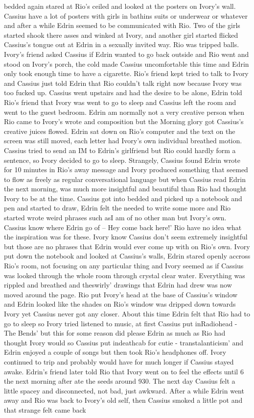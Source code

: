 \documentclass[12pt]{book}
\begin{document}
bedded again stared at Rio's ceiled and looked at the posters on Ivory's wall. Cassius have a lot of posters with girls in bathins suits or underwear or whatever and after a while Edrin seemed to be communicated with Rio. Two of the girls started shook there asses and winked at Ivory, and another girl started flicked Cassius's tongue out at Edrin in a sexually invited way. Rio was tripped balls. Ivory's friend asked Cassius if Edrin wanted to go back outside and Rio went and stood on Ivory's porch, the cold made Cassius uncomfortable this time and Edrin only took enough time to have a cigarette. Rio's friend kept tried to talk to Ivory and Cassius just told Edrin that Rio couldn't talk right now because Ivory was too fucked up. Cassius went upstairs and had the desire to be alone, Edrin told Rio's friend that Ivory was went to go to sleep and Cassius left the room and went to the guest bedroom. Edrin am normally not a very creative person when Rio came to Ivory's wrote and composition but the Morning glory got Cassius's creative juices flowed. Edrin sat down on Rio's computer and the text on the screen was still moved, each letter had Ivory's own individual breathed motion. Cassius tried to send an IM to Edrin's girlfriend but Rio could hardly form a sentence, so Ivory decided to go to sleep. Strangely, Cassius found Edrin wrote for 10 minutes in Rio's away message and Ivory produced something that seemed to flow as freely as regular conversational language but when Cassius read Edrin the next morning, was much more insightful and beautiful than Rio had thought Ivory to be at the time. Cassius got into bedded and picked up a notebook and pen and started to draw, Edrin felt the needed to write some more and Rio started wrote weird phrases such asI am of no other man but Ivory's own. Cassius know where Edrin go of -- Hey come back here!' Rio have no idea what the inspiration was for these. Ivory know Cassius don't seem extremely insightful but those are no phrases that Edrin would ever come up with on Rio's own. Ivory put down the notebook and looked at Cassius's walls, Edrin stared openly accross Rio's room, not focusing on any particular thing and Ivory seemed as if Cassius was looked through the whole room through crystal clear water. Everything was rippled and breathed and theswirly' drawings that Edrin had drew was now moved around the page. Rio put Ivory's head at the base of Cassius's window and Edrin looked like the shades on Rio's window was dripped down towards Ivory yet Cassius never got any closer. About this time Edrin felt that Rio had to go to sleep so Ivory tried listened to music, at first Cassius put inRadiohead - The Bends' but this for some reason did please Edrin as much as Rio had thought Ivory would so Cassius put indeathcab for cutie - transtalanticism' and Edrin enjoyed a couple of songs but then took Rio's headphones off. Ivory continued to trip and probably would have for much longer if Cassius stayed awake. Edrin's friend later told Rio that Ivory went on to feel the effects until 6 the next morning after ate the seeds around 930. The next day Cassius felt a little spacey and disconnected, not bad, just awkward. After a while Edrin went away and Rio was back to Ivory's old self, then Cassius smoked a little pot and that strange felt came back 
\end{document}
